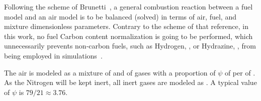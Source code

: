     Following the scheme of Brunetti~\cite{2012-BrunettiF-Blucher}, a general combustion reaction between a fuel  model  and  an
    air model is to be balanced (solved) in terms of air, fuel, and mixture dimensionless parameters. Contrary to the scheme  of
    that reference, in this work, no fuel Carbon content normalization is going to be performed,  which  unnecessarily  prevents
    non-carbon   fuels,   such   as   Hydrogen,    ,    or    Hydrazine,    ,    from    being    employed    in
    simulations~\cite{2018-SilvaRKO-UTFPR}.

    The air is modeled as a mixture of  and of  gases with a proportion of  $\psi$  {\kilo\mole}  of    per
    {\kilo\mole} of . As the Nitrogen will be kept inert, all inert gases are modeled as  .  A  typical  value  of
    $\psi$ is $79/21 \approx 3.76$.

